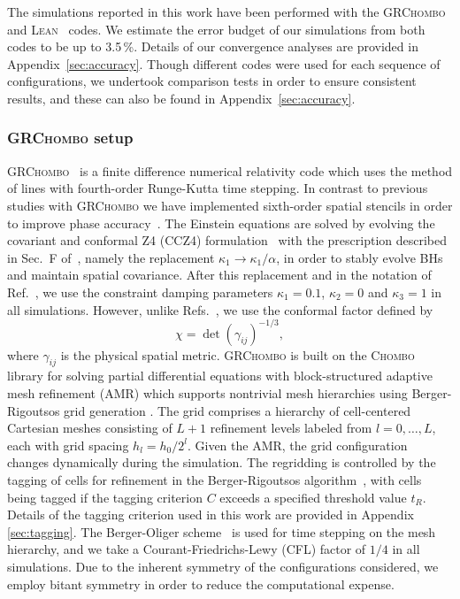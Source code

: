 \documentclass[floats,floatfix,showpacs,amssymb,physrev,twocolumn,superscriptaddress,reprint,
nofootinbib, longbibliography]{revtex4-2}
\begin{document}
The simulations reported in this work have been performed with the
\textsc{GRChombo}~\cite{Clough:2015sqa, GRChomboWebsite} and 
\textsc{Lean}~\cite{Sperhake:2006cy} codes.
We estimate the error budget of our simulations from both codes to be up to 3.5\,\%. Details of our convergence analyses are provided in 
Appendix~\ref{sec:accuracy}. Though different codes were
used for each sequence of configurations, we undertook comparison tests 
in order to ensure consistent results, and these can also be found in
Appendix~\ref{sec:accuracy}.

\subsubsection{\textsc{GRChombo} setup}
\label{sec:grchombo}
\textsc{GRChombo}~\cite{Clough:2015sqa} is a finite difference
numerical relativity code which uses the method of lines with
fourth-order Runge-Kutta time stepping. In contrast to previous studies
with \textsc{GRChombo} we have implemented sixth-order spatial
stencils in order to improve phase accuracy~\cite{Husa:2007hp}. The
Einstein equations are solved by evolving the covariant and conformal
Z4 (CCZ4) formulation~\cite{Alic:2011gg} with the prescription
described in Sec.~F of~\cite{Alic:2013xsa}, namely the replacement
$\kappa_1 \to \kappa_1/\alpha$, in order to stably evolve BHs
and maintain spatial covariance. After this replacement and in the
notation of Ref.~\cite{Alic:2011gg}, we use the constraint damping
parameters $\kappa_1=0.1$, $\kappa_2=0$ and $\kappa_3=1$ in all
simulations.  However, unlike Refs.~\cite{Clough:2015sqa,Alic:2011gg},
we use the conformal factor defined by
\begin{equation}
    \chi = \det(\gamma_{ij})^{-1/3},\label{eq:con-fac}
\end{equation}
where $\gamma_{ij}$ is the physical spatial metric.
\textsc{GRChombo} is built on the \textsc{Chombo}~\cite{ChomboReport} 
library for solving partial differential equations with 
block-structured adaptive mesh refinement (AMR) which supports
nontrivial mesh hierarchies using Berger-Rigoutsos grid generation
\cite{Berger1991}. The grid comprises a hierarchy of cell-centered 
Cartesian meshes consisting of $L+1$ refinement levels labeled from 
$l=0,\ldots,L$, each with grid spacing $h_l=h_0/2^l$. Given the 
AMR, the grid configuration changes dynamically during the simulation.
The regridding is controlled by the tagging of cells for refinement 
in the Berger-Rigoutsos algorithm~\cite{Berger1991}, with cells being 
tagged if the tagging criterion $C$ exceeds a specified threshold 
value $t_R$. Details of the tagging criterion used in this work are 
provided in Appendix \ref{sec:tagging}. The Berger-Oliger scheme~\cite{Berger1991} 
is used for time stepping on the mesh hierarchy, and we take a 
Courant-Friedrichs-Lewy (CFL) factor of $1/4$ in all simulations. 
Due to the inherent symmetry of the configurations considered, we 
employ bitant symmetry in order to reduce the computational expense.
\end{document}
